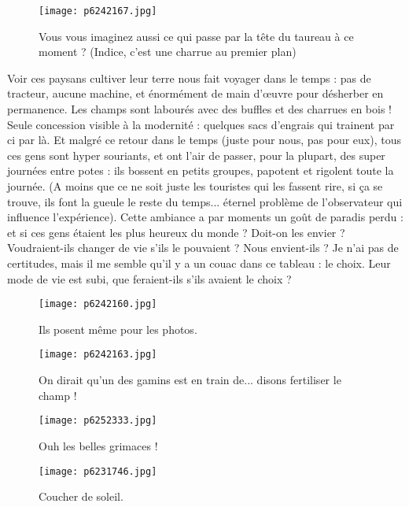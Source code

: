 \documentclass{book}
\begin{document}
\begin{figure}[h]
\centering
\texttt{[image: p6242167.jpg]}
\caption*{Vous vous imaginez aussi ce qui passe par la tête du taureau à ce moment ? (Indice, c'est une charrue au premier plan)}
\end{figure}

Voir ces paysans cultiver leur terre nous fait voyager dans le temps : pas de tracteur, aucune machine, et énormément de main d’œuvre pour désherber en permanence. Les champs sont labourés avec des buffles et des charrues en bois ! Seule concession visible à la modernité : quelques sacs d'engrais qui trainent par ci par là. Et malgré ce retour dans le temps (juste pour nous, pas pour eux), tous ces gens sont hyper souriants, et ont l'air de passer, pour la plupart, des super journées entre potes : ils bossent en petits groupes, papotent et rigolent toute la journée. (A moins que ce ne soit juste les touristes qui les fassent rire, si ça se trouve, ils font la gueule le reste du temps... éternel problème de l'observateur qui influence l'expérience). Cette ambiance a par moments un goût de paradis perdu : et si ces gens étaient les plus heureux du monde ? Doit-on les envier ? Voudraient-ils changer de vie s'ils le pouvaient ? Nous envient-ils ? Je n'ai pas de certitudes, mais il me semble qu'il y a un couac dans ce tableau : le choix. Leur mode de vie est subi, que feraient-ils s'ils avaient le choix ?




\begin{figure}[h]
\centering
\texttt{[image: p6242160.jpg]}
\caption*{Ils posent même pour les photos.}
\end{figure}


\begin{figure}[h]
\centering
\texttt{[image: p6242163.jpg]}
\caption*{On dirait qu'un des gamins est en train de... disons fertiliser le champ !}
\end{figure}


\begin{figure}[h]
\centering
\texttt{[image: p6252333.jpg]}
\caption*{Ouh les belles grimaces !}
\end{figure}


\begin{figure}[h]
\centering
\texttt{[image: p6231746.jpg]}
\caption*{Coucher de soleil.}
\end{figure}
\end{document}
